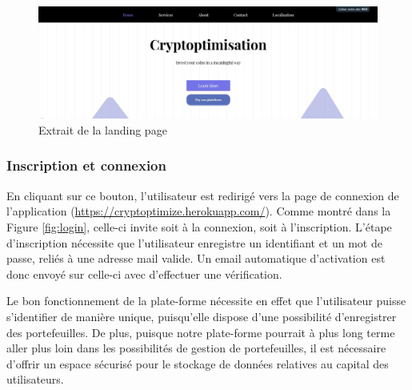 \documentclass[a4paper, 10pt]{article}
\begin{document}
\begin{figure}[ht!]
\begin{center}
\includegraphics[width=1.0\textwidth]{images/landing.JPG}
\caption{Extrait de la landing page}
\label{fig:landingpage}
\end{center}
\end{figure}

\subsubsection{Inscription et connexion}
\label{sec:developpement_pages_inscription}

En cliquant sur ce bouton, l'utilisateur est redirigé vers la page de connexion de l'application (\url{https://cryptoptimize.herokuapp.com/}). Comme montré dans la Figure \ref{fig:login}, celle-ci invite soit à la connexion, soit à l'inscription. L'étape d'inscription nécessite que l'utilisateur enregistre un identifiant et un mot de passe, reliés à une adresse mail valide. Un email automatique d'activation est donc envoyé sur celle-ci avec d'effectuer une vérification.

Le bon fonctionnement de la plate-forme nécessite en effet que l'utilisateur puisse s'identifier de manière unique, puisqu'elle dispose d'une possibilité d'enregistrer des portefeuilles. De plus, puisque notre plate-forme pourrait à plus long terme aller plus loin dans les possibilités de gestion de portefeuilles, il est nécessaire d'offrir un espace sécurisé pour le stockage de données relatives au capital des utilisateurs.
\end{document}
